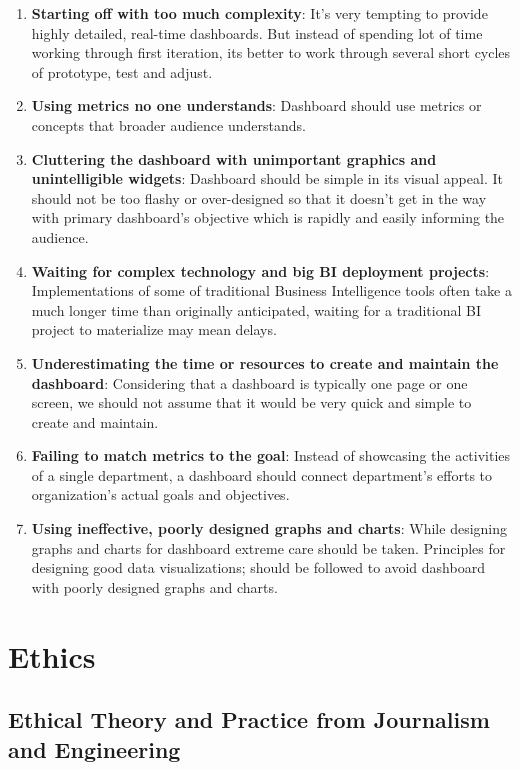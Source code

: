 \documentclass[]{book}
\theoremstyle{definition}
\theoremstyle{definition}
\theoremstyle{definition}
\theoremstyle{remark}
\begin{document}
\begin{enumerate}
\def\labelenumi{\arabic{enumi}.}
\item
  \textbf{Starting off with too much complexity}: It's very tempting to
  provide highly detailed, real-time dashboards. But instead of spending
  lot of time working through first iteration, its better to work
  through several short cycles of prototype, test and adjust.
\item
  \textbf{Using metrics no one understands}: Dashboard should use
  metrics or concepts that broader audience understands.
\item
  \textbf{Cluttering the dashboard with unimportant graphics and
  unintelligible widgets}: Dashboard should be simple in its visual
  appeal. It should not be too flashy or over-designed so that it
  doesn't get in the way with primary dashboard's objective which is
  rapidly and easily informing the audience.
\item
  \textbf{Waiting for complex technology and big BI deployment
  projects}: Implementations of some of traditional Business
  Intelligence tools often take a much longer time than originally
  anticipated, waiting for a traditional BI project to materialize may
  mean delays.
\item
  \textbf{Underestimating the time or resources to create and maintain
  the dashboard}: Considering that a dashboard is typically one page or
  one screen, we should not assume that it would be very quick and
  simple to create and maintain.
\item
  \textbf{Failing to match metrics to the goal}: Instead of showcasing
  the activities of a single department, a dashboard should connect
  department's efforts to organization's actual goals and objectives.
\item
  \textbf{Using ineffective, poorly designed graphs and charts}: While
  designing graphs and charts for dashboard extreme care should be
  taken. Principles for designing good data visualizations; should be
  followed to avoid dashboard with poorly designed graphs and charts.
\end{enumerate}

\chapter{Ethics}\label{ethics}

\section{Ethical Theory and Practice from Journalism and
Engineering}\label{ethical-theory-and-practice-from-journalism-and-engineering}
\end{document}
